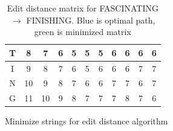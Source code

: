 \begin{table}
\begin{center}
\begin{tabular}[c]{c|c|c|c|c|c|c|c|c|c|c|}
			T & 8                    & \cellcolor{green!25}7 & \cellcolor{green!25}6 & \cellcolor{green!25}5 & \cellcolor{green!25}5 & \cellcolor{green!25}5 & \cellcolor{blue!25}6  & 6                    & 6                    & 6                    \\\hline
			I & 9                    & 8                     & 7                     & 6                     & 5                     & 6                     & 6                     & \cellcolor{blue!25}6 & 7                    & 7                    \\\hline
			N & 10                   & 9                     & 8                     & 7                     & 6                     & 6                     & 7                     & 7                    & \cellcolor{blue!25}6 & 7                    \\\hline
			G & 11                   & 10                    & 9                     & 8                     & 7                     & 7                     & 7                     & 8                    & 7                    & \cellcolor{blue!25}6 \\\hline \end{tabular} \end{center} \caption{Edit distance matrix for FASCINATING $\rightarrow$ FINISHING. Blue
		is optimal path, green is minimized matrix}
	\label{tab:minimizededitmatrix}
\end{table}

\begin{algorithm}[t]
  \SetAlgoLined\DontPrintSemicolon

  \vspace{0.5cm}
  \caption{Minimize strings for edit distance algorithm}
  \label{alg:minimizededitstrings}
\end{algorithm}

